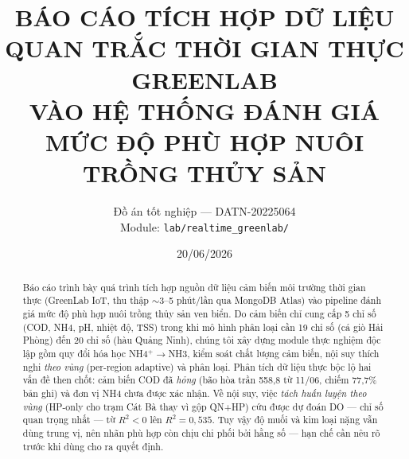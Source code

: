 \documentclass[a4paper,12pt]{article}
\title{\textbf{BÁO CÁO TÍCH HỢP DỮ LIỆU QUAN TRẮC THỜI GIAN THỰC GREENLAB\\
VÀO HỆ THỐNG ĐÁNH GIÁ MỨC ĐỘ PHÙ HỢP NUÔI TRỒNG THỦY SẢN}}
\author{Đồ án tốt nghiệp --- DATN-20225064\\Module: \texttt{lab/realtime\_greenlab/}}
\date{20/06/2026}
\begin{document}
\maketitle

\begin{abstract}
Báo cáo trình bày quá trình tích hợp nguồn dữ liệu cảm biến môi trường thời gian thực (GreenLab IoT, thu thập $\sim$3--5 phút/lần qua MongoDB Atlas) vào pipeline đánh giá mức độ phù hợp nuôi trồng thủy sản ven biển. Do cảm biến chỉ cung cấp 5 chỉ số (COD, NH4, pH, nhiệt độ, TSS) trong khi mô hình phân loại cần 19 chỉ số (cá giò Hải Phòng) đến 20 chỉ số (hàu Quảng Ninh), chúng tôi xây dựng module thực nghiệm độc lập gồm quy đổi hóa học NH4$^+\to$NH3, kiểm soát chất lượng cảm biến, nội suy thích nghi \emph{theo vùng} (per-region adaptive) và phân loại. Phân tích dữ liệu thực bộc lộ hai vấn đề then chốt: cảm biến COD đã \emph{hỏng} (bão hòa trần 558{,}8 từ 11/06, chiếm 77{,}7\% bản ghi) và đơn vị NH4 chưa được xác nhận. Về nội suy, việc \emph{tách huấn luyện theo vùng} (HP-only cho trạm Cát Bà thay vì gộp QN+HP) cứu được dự đoán DO --- chỉ số quan trọng nhất --- từ $R^2<0$ lên $R^2=0{,}535$. Tuy vậy độ muối và kim loại nặng vẫn dùng trung vị, nên nhãn phù hợp còn chịu chi phối bởi hằng số --- hạn chế cần nêu rõ trước khi dùng cho ra quyết định.
\end{abstract}

\tableofcontents
\newpage





\end{document}
